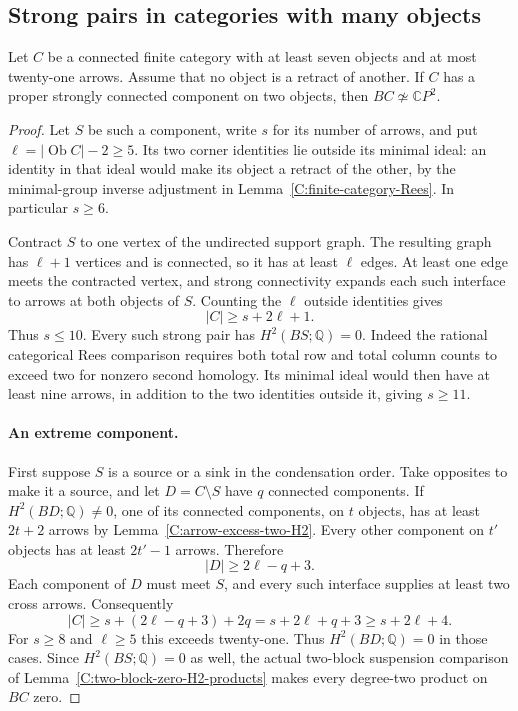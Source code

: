 \subsection{Strong pairs in categories with many objects}

\begin{proposition}\label{C:seven-objects-strong-pair21}
Let $C$ be a connected finite category with at least seven
objects and at most twenty-one arrows.  Assume that no
object is a retract of another.  If $C$ has a proper
strongly connected component on two objects, then
$BC\not\simeq\mathbb CP^2$.
\end{proposition}
\begin{proof}
Let $S$ be such a component, write $s$ for its number of
arrows, and put $\ell=|\operatorname{Ob}C|-2\geq5$.
Its two corner identities lie outside its minimal ideal:
an identity in that ideal would make its object a retract
of the other, by the minimal-group inverse adjustment in
Lemma~\ref{C:finite-category-Rees}.  In particular $s\geq6$.

Contract $S$ to one vertex of the undirected support graph.
The resulting graph has $\ell+1$ vertices and is connected,
so it has at least $\ell$ edges.  At least one edge meets
the contracted vertex, and strong connectivity expands
each such interface to arrows at both objects of $S$.
Counting the $\ell$ outside identities gives
\[
 |C|\geq s+2\ell+1.
\]
Thus $s\leq10$.  Every such strong pair has
$H^2(BS;\mathbb Q)=0$.  Indeed the rational categorical
Rees comparison requires both total row and total column
counts to exceed two for nonzero second homology.  Its
minimal ideal would then have at least nine arrows, in
addition to the two identities outside it, giving
$s\geq11$.

\paragraph{An extreme component.}
First suppose $S$ is a source or a sink in the
condensation order.  Take opposites to make it a source,
and let $D=C\setminus S$ have $q$ connected components.
If $H^2(BD;\mathbb Q)\ne0$, one of its connected
components, on $t$ objects, has at least $2t+2$ arrows
by Lemma~\ref{C:arrow-excess-two-H2}.  Every other
component on $t'$ objects has at least $2t'-1$ arrows.
Therefore
\[
 |D|\geq2\ell-q+3.
\]
Each component of $D$ must meet $S$, and every such
interface supplies at least two cross arrows.
Consequently
\[
 |C|\geq s+(2\ell-q+3)+2q
       =s+2\ell+q+3\geq s+2\ell+4.
\]
For $s\geq8$ and $\ell\geq5$ this exceeds twenty-one.
Thus $H^2(BD;\mathbb Q)=0$ in those cases.  Since
$H^2(BS;\mathbb Q)=0$ as well, the actual two-block
suspension comparison of
Lemma~\ref{C:two-block-zero-H2-products} makes every
degree-two product on $BC$ zero.


\end{proof}
